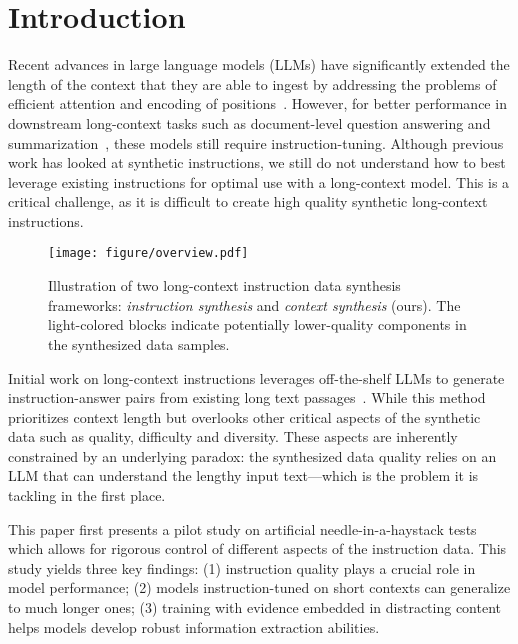 \section{Introduction}
Recent advances in large language models (LLMs) have significantly extended the length of the context that they are able to ingest by addressing the problems of efficient attention and encoding of positions~\cite{su2024roformer,peng2024yarn,fu2024data,dubey2024llama}.
However, for better performance in downstream long-context tasks such as document-level question answering and summarization~\cite{shaham2023zeroscrolls,bai2024longbench,karpinska2024one}, these models still require instruction-tuning.
Although previous work has looked at synthetic instructions, we still do not understand how to best leverage existing instructions for optimal use with a long-context model.
This is a critical challenge, as it is difficult to create high quality synthetic long-context instructions.

\begin{figure}
    \centering
    \texttt{[image: figure/overview.pdf]}
    \caption{Illustration of two long-context instruction data synthesis frameworks: \textit{instruction synthesis} and \textit{context synthesis} (ours). The light-colored blocks indicate potentially lower-quality components in the synthesized data samples.}
    \label{fig:illustration}
\end{figure}

Initial work on long-context instructions leverages off-the-shelf LLMs to generate instruction-answer pairs from existing long text passages~\cite{bai2024longalign, dubey2024llama}.
While this method prioritizes context length but overlooks other critical aspects of the synthetic data such as quality, difficulty and diversity.
These aspects are inherently constrained by an underlying paradox: the synthesized data quality relies on an LLM that can understand the lengthy input text---which is the problem it is tackling in the first place.

This paper first presents a pilot study on artificial needle-in-a-haystack tests~\cite{kamradt2023needle, hsieh2024ruler} which allows for rigorous control of different aspects of the instruction data.
This study yields three key findings: (1) instruction quality plays a crucial role in model performance; (2) models instruction-tuned on short contexts can generalize to much longer ones; (3) training with evidence embedded in distracting content helps models develop robust information extraction abilities.

